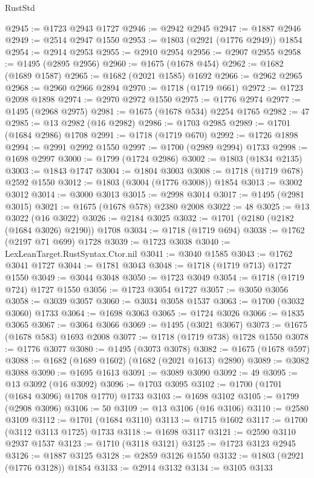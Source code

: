 \begin{lexlean}{RustStd}
\begin{coremodule}
@2945 := @1723 @2943 @1727
@2946 := @2942 @2945
@2947 := @1887 @2946
@2949 := @2514 @2947 @1550
@2953 := @1803 (@2921 (@1776 @2949)) @1854
@2954 := @2914 @2953
@2955 := @2910 @2954
@2956 := @2907 @2955
@2958 := @1495 (@2895 @2956)
@2960 := @1675 (@1678 @454)
@2962 := @1682 (@1689 @1587)
@2965 := @1682 (@2021 @1585) @1692
@2966 := @2962 @2965
@2968 := @2960 @2966 @2894
@2970 := @1718 (@1719 @661)
@2972 := @1723 @2098 @1898
@2974 := @2970 @2972 @1550
@2975 := @1776 @2974
@2977 := @1495 (@2968 @2975)
@2981 := @1675 (@1678 @534) @2254 @1765
@2982 := 47
@2985 := @13 @2982 (@16 @2982)
@2986 := @1703 @2985
@2989 := @1701 (@1684 @2986) @1708
@2991 := @1718 (@1719 @670)
@2992 := @1726 @1898
@2994 := @2991 @2992 @1550
@2997 := @1700 (@2989 @2994) @1733
@2998 := @1698 @2997
@3000 := @1799 (@1724 @2986)
@3002 := @1803 (@1834 @2135)
@3003 := @1843 @1747
@3004 := @1804 @3003
@3008 := @1718 (@1719 @678) @2592 @1550
@3012 := @1803 (@3004 (@1776 @3008)) @1854
@3013 := @3002 @3012
@3014 := @3000 @3013
@3015 := @2998 @3014
@3017 := @1495 (@2981 @3015)
@3021 := @1675 (@1678 @578) @2380 @2008
@3022 := 48
@3025 := @13 @3022 (@16 @3022)
@3026 := @2184 @3025
@3032 := @1701 (@2180 (@2182 (@1684 @3026) @2190)) @1708
@3034 := @1718 (@1719 @694)
@3038 := @1762 (@2197 @71 @699) @1728
@3039 := @1723 @3038
@3040 := LexLeanTarget.RustSyntax.Ctor.nil
@3041 := @3040 @1585
@3043 := @1762 @3041 @1727
@3044 := @1781 @3043
@3048 := @1718 (@1719 @713) @1727 @1550
@3049 := @3044 @3048
@3050 := @1723 @3049
@3054 := @1718 (@1719 @724) @1727 @1550
@3056 := @1723 @3054 @1727
@3057 := @3050 @3056
@3058 := @3039 @3057
@3060 := @3034 @3058 @1537
@3063 := @1700 (@3032 @3060) @1733
@3064 := @1698 @3063
@3065 := @1724 @3026
@3066 := @1835 @3065
@3067 := @3064 @3066
@3069 := @1495 (@3021 @3067)
@3073 := @1675 (@1678 @583) @1693 @2008
@3077 := @1718 (@1719 @738) @1728 @1550
@3078 := @1776 @3077
@3080 := @1495 (@3073 @3078)
@3082 := @1675 (@1678 @597)
@3088 := @1682 (@1689 @1602) (@1682 (@2021 @1613) @2890)
@3089 := @3082 @3088
@3090 := @1695 @1613
@3091 := @3089 @3090
@3092 := 49
@3095 := @13 @3092 (@16 @3092)
@3096 := @1703 @3095
@3102 := @1700 (@1701 (@1684 @3096) @1708 @1770) @1733
@3103 := @1698 @3102
@3105 := @1799 (@2908 @3096)
@3106 := 50
@3109 := @13 @3106 (@16 @3106)
@3110 := @2580 @3109
@3112 := @1701 (@1684 @3110)
@3113 := @1715 @1602
@3117 := @1700 (@3112 @3113 @1725) @1733
@3118 := @1698 @3117
@3121 := @2590 @3110 @2937 @1537
@3123 := @1710 (@3118 @3121)
@3125 := @1723 @3123 @2945
@3126 := @1887 @3125
@3128 := @2859 @3126 @1550
@3132 := @1803 (@2921 (@1776 @3128)) @1854
@3133 := @2914 @3132
@3134 := @3105 @3133

\end{coremodule}
\end{lexlean}
